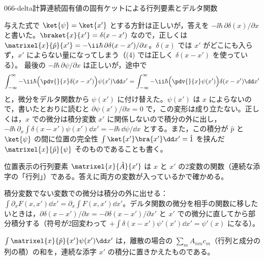 \documentclass[uplatex,dvipdfmx,a4paper,11pt]{jsarticle}
\begin{document}
\begin{mondai}{066-delta}{計算}{連続固有値の固有ケットによる行列要素とデルタ関数}
\begin{kotaeran}
   与えた式で $\ket{\psi}=\ket{x'}$ とする方針は正しいが，答えを $-\ii\hbar\,\partial\delta(x)/\partial x$ と書いた。$\braket{x}{x'}=\delta(x-x')$ なので，正しくは $\matrixel{x}{\hat{p}}{x'}=-\ii\hbar\,\partial\delta(x-x')/\partial x$。$\delta(x)$ では $x'$ がどこにも入らず，$x'$ によらない量になってしまう（(4) では正しく $\delta(x-x')$ を使っている）。
   最後の $-\ii\hbar\,\partial\psi/\partial x$ は正しいが，途中で
  \[ \int_{-\infty}^{\infty}-\ii\hbar\Bigl(\pdv{}{x}\delta(x-x')\Bigr)\psi(x')\dd x'=\int_{-\infty}^{\infty}-\ii\hbar\Bigl(\pdv{}{x}\psi(x')\Bigr)\delta(x-x')\dd x' \]
  と，微分をデルタ関数から $\psi(x')$ に付け替えた。$\psi(x')$ は $x$ によらないので，書いたとおりに読むと $\partial\psi(x')/\partial x=0$ で，この変形は成り立たない。正しくは，$x$ での微分は積分変数 $x'$ に関係しないので積分の外に出し，$-\ii\hbar\,\partial_{x}\int\delta(x-x')\psi(x')\dd x'=-\ii\hbar\,\dd\psi/\dd x$ とする。また，この積分が $\hat{p}$ と $\ket{\psi}$ の間に位置の完全性 $\int\ket{x'}\bra{x'}\dd x'=\hat{1}$ を挟んだ $\matrixel{x}{\hat{p}}{\psi}$ そのものであることも書く。
\end{kotaeran}
\begin{rikai}
  \item 位置表示の行列要素 $\matrixel{x}{\hat{A}}{x'}$ は $x$ と $x'$ の2変数の関数（連続な添字の「行列」）である。答えに両方の変数が入っているかで確かめる。
  \item 積分変数でない変数での微分は積分の外に出せる：$\int\partial_{x}F(x,x')\dd x'=\partial_{x}\int F(x,x')\dd x'$。デルタ関数の微分を相手の関数に移したいときは，$\partial\delta(x-x')/\partial x=-\partial\delta(x-x')/\partial x'$ と $x'$ での微分に直してから部分積分する（符号が2回変わって $+\int\delta(x-x')\psi'(x')\dd x'=\psi'(x)$ になる）。
  \item $\int\matrixel{x}{\hat{p}}{x'}\psi(x')\dd x'$ は，離散の場合の $\sum_{m}A_{nm}c_{m}$（行列と成分の列の積）の和を，連続な添字 $x'$ の積分に置きかえたものである。
\end{rikai}
\end{mondai}
\end{document}
